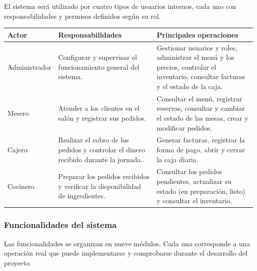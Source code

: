 \documentclass[12pt,a4paper,oneside]{article}
\begin{document}
El sistema será utilizado por cuatro tipos de usuarios internos, cada uno con responsabilidades y permisos definidos según su rol.

{\small\renewcommand{\arraystretch}{1.2}
\begin{longtable}{P{2.2cm}P{4.6cm}P{7.2cm}}
\toprule
\textbf{Actor} & \textbf{Responsabilidades} & \textbf{Principales operaciones} \\ \midrule
\endhead
Administrador & Configurar y supervisar el funcionamiento general del sistema. & Gestionar usuarios y roles, administrar el menú y los precios, controlar el inventario, consultar facturas y el estado de la caja. \\ \midrule
Mesero & Atender a los clientes en el salón y registrar sus pedidos. & Consultar el menú, registrar reservas, consultar y cambiar el estado de las mesas, crear y modificar pedidos. \\ \midrule
Cajero & Realizar el cobro de los pedidos y controlar el dinero recibido durante la jornada. & Generar facturas, registrar la forma de pago, abrir y cerrar la caja diaria. \\ \midrule
Cocinero & Preparar los pedidos recibidos y verificar la disponibilidad de ingredientes. & Consultar los pedidos pendientes, actualizar su estado (en preparación, listo) y consultar el inventario. \\ \bottomrule
\end{longtable}}

\subsubsection{Funcionalidades del sistema}

Las funcionalidades se organizan en nueve módulos. Cada una corresponde a una operación real que puede implementarse y comprobarse durante el desarrollo del proyecto.
\end{document}
